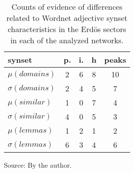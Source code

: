 \begin{table}[h!]
\begin{center}
\caption{Counts of evidence of differences related to Wordnet adjective synset characteristics in the Erd\"os sectors in each of the analyzed networks.}
\begin{tabular}{| l || c | c | c || c |}\hline
{\bf synset} & {\bf p.} & {\bf i.} & {\bf h} & {\bf peaks} \\\hline\hline
$\mu(domains)$ & 2  & 6  & 8  & 10 \\
$\sigma(domains)$ & 2  & 4  & 5  & 7 \\\hline
$\mu(similar)$ & 1  & 0  & 7  & 4 \\
$\sigma(similar)$ & 4  & 0  & 5  & 3 \\\hline
$\mu(lemmas)$ & 1  & 2  & 1  & 2 \\
$\sigma(lemmas)$ & 6  & 3  & 4  & 6 \\\hline
\end{tabular}
\begin{flushleft}\footnotesize
		Source: By the author.\
\end{flushleft}
\end{center}
\end{table}
